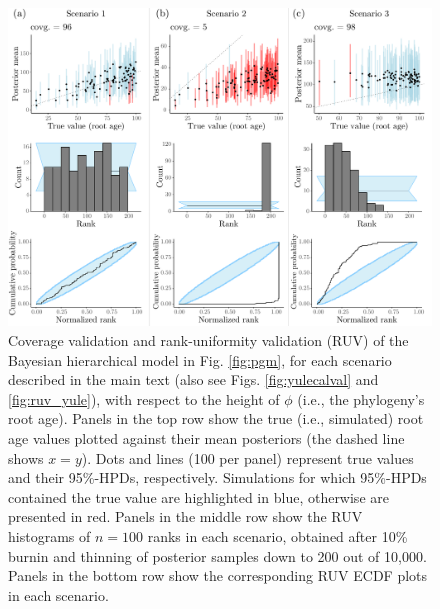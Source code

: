 \documentclass[oneside]{article}
\begin{document}

\begin{figure}
  \centering
  \includegraphics[width=0.95\linewidth]{../figures/treeHeight_manual.pdf}
  \caption{
    Coverage validation and rank-uniformity validation (RUV) of the Bayesian hierarchical model in Fig. \ref{fig:pgm}, for each scenario described in the main text (also see Figs. \ref{fig:yulecalval} and \ref{fig:ruv_yule}), with respect to the height of $\phi$ (i.e., the phylogeny's root age).
    Panels in the top row show the true (i.e., simulated) root age values plotted against their mean posteriors (the dashed line shows $x = y$).
    Dots and lines (100 per panel) represent true values and their 95\%-HPDs, respectively.
    Simulations for which 95\%-HPDs contained the true value are highlighted in blue, otherwise are presented in red.
    Panels in the middle row show the RUV histograms of $n=100$ ranks in each scenario, obtained after 10\% burnin and thinning of posterior samples down to 200 out of 10,000.
    Panels in the bottom row show the corresponding RUV ECDF plots in each scenario.
  }
  \label{fig:treeheight}
\end{figure}
\end{document}
